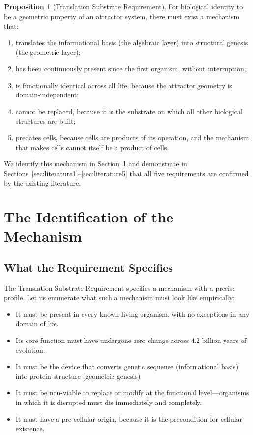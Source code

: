 \documentclass[11pt]{article}
\theoremstyle{definition}
\newtheorem{proposition}{Proposition}[section]
\begin{document}
\begin{proposition}[Translation Substrate Requirement]
For biological identity to be a geometric property of an attractor
system, there must exist a mechanism that:
\begin{enumerate}[label=(\roman*)]
    \item translates the informational basis (the algebraic layer)
    into structural genesis (the geometric layer);
    \item has been continuously present since the first organism,
    without interruption;
    \item is functionally identical across all life,
    because the attractor geometry is domain-independent;
    \item cannot be replaced, because it is the substrate on
    which all other biological structures are built;
    \item predates cells, because cells are products of its operation,
    and the mechanism that makes cells cannot itself be a product of cells.
\end{enumerate}
\end{proposition}

We identify this mechanism in Section~\ref{sec:identification} and
demonstrate in Sections~\ref{sec:literature1}--\ref{sec:literature5}
that all five requirements are confirmed by the existing literature.

\section{The Identification of the Mechanism}
\label{sec:identification}

\subsection{What the Requirement Specifies}

The Translation Substrate Requirement specifies a mechanism with a
precise profile.
Let us enumerate what such a mechanism must look like empirically:

\begin{itemize}
    \item It must be present in every known living organism,
    with no exceptions in any domain of life.
    \item Its core function must have undergone zero change
    across 4.2 billion years of evolution.
    \item It must be the device that converts genetic sequence
    (informational basis) into protein structure (geometric genesis).
    \item It must be non-viable to replace or modify at the
    functional level---organisms in which it is disrupted must die
    immediately and completely.
    \item It must have a pre-cellular origin, because it is the
    precondition for cellular existence.
\end{itemize}
\end{document}
